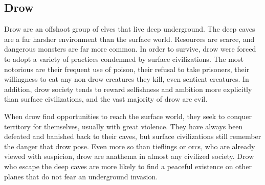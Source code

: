     \subsection{Drow}

        Drow are an offshoot group of elves that live deep underground.
        The deep caves are a far harsher environment than the surface world.
        Resources are scarce, and dangerous monsters are far more common.
        In order to survive, drow were forced to adopt a variety of practices condemned by surface civilizations.
        The most notorious are their frequent use of poison, their refusal to take prisoners, their willingness to eat any non-drow creatures they kill, even sentient creatures.
        In addition, drow society tends to reward selfishness and ambition more explicitly than surface civilizations, and the vast majority of drow are evil.

        When drow find opportunities to reach the surface world, they seek to conquer territory for themselves, usually with great violence.
        They have always been defeated and banished back to their caves, but surface civilizations still remember the danger that drow pose.
        Even more so than tieflings or orcs, who are already viewed with suspicion, drow are anathema in almost any civilized society.
        Drow who escape the deep caves are more likely to find a peaceful existence on other planes that do not fear an underground invasion.

